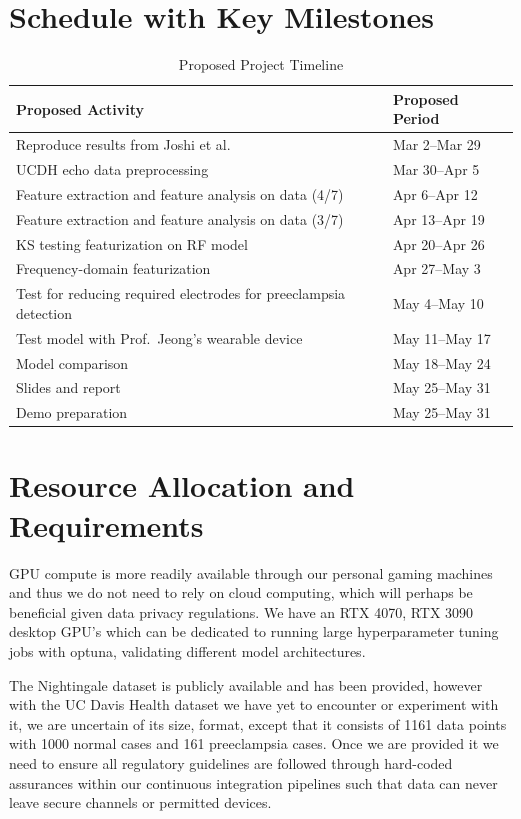 \documentclass[sigconf,nonacm]{acmart}
\begin{document}
  \section{Schedule with Key Milestones}

\begin{table}[H]
\caption{Proposed Project Timeline}
\label{tab:timeline}
\small
\centering
\begin{tabular}{p{}p{}}
\toprule
\textbf{Proposed Activity} & \textbf{Proposed Period} \\
\midrule
Reproduce results from Joshi et al.\ \cite{joshi2025linkingecgecho} & Mar 2--Mar 29 \\
UCDH echo data preprocessing & Mar 30--Apr 5 \\
Feature extraction and feature analysis on data (4/7) & Apr 6--Apr 12 \\
Feature extraction and feature analysis on data (3/7) & Apr 13--Apr 19 \\
KS testing featurization on RF model & Apr 20--Apr 26 \\
Frequency-domain featurization & Apr 27--May 3 \\
Test for reducing required electrodes for preeclampsia detection & May 4--May 10 \\
Test model with Prof.\ Jeong's wearable device & May 11--May 17 \\
Model comparison & May 18--May 24 \\
Slides and report & May 25--May 31 \\
Demo preparation & May 25--May 31 \\
\bottomrule
\end{tabular}
\end{table}

  \section{Resource Allocation and Requirements}
GPU compute is more readily available through our personal gaming machines and thus we do not need to rely on cloud computing, which will perhaps be beneficial given data privacy regulations. We have an RTX 4070, RTX 3090 desktop GPU's which can be dedicated to running large hyperparameter tuning jobs with optuna, validating different model architectures.

The Nightingale dataset is publicly available and has been provided, however with the UC Davis Health dataset we have yet to encounter or experiment with it, we are uncertain of its size, format, except that it consists  of 1161 data points with 1000 normal cases and 161 preeclampsia cases. Once we are provided it we need to ensure all regulatory guidelines are followed through hard-coded assurances within our continuous integration pipelines such that data can never leave secure channels or permitted devices.
\end{document}
